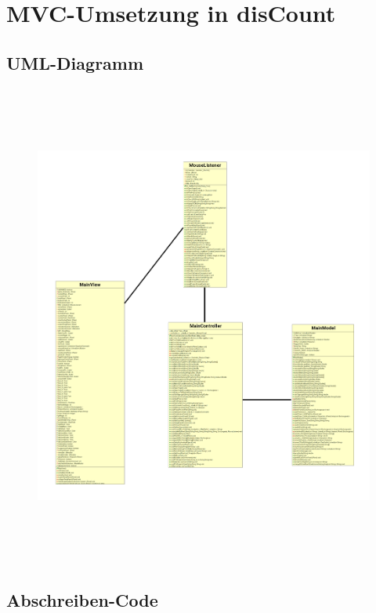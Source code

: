 \documentclass[12pt]{report}
\begin{document}




\listoffigures
{}

\newpage
\newpage





\appendix
{}						
\chapter{MVC-Umsetzung in disCount}

\section{UML-Diagramm}
\begin{figure}[h]
	\centering
	\includegraphics[height=16cm]{images/mvc_dc}
\end{figure}

\newpage

\section{Abschreiben-Code}
\end{document}

